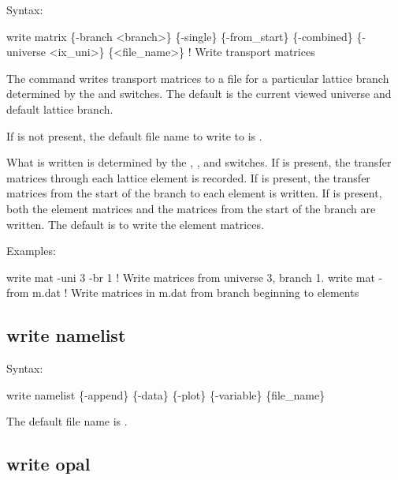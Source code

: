 {{{{{{{{{{{Syntax:
\begin{example}
    write matrix \{-branch <branch>\} \{-single\} \{-from_start\} \{-combined\}
               \{-universe <ix_uni>\} \{<file_name>\}  ! Write transport matrices
\end{example}

The  command writes transport matrices to a file for a particular lattice branch
determined by the  and  switches. The default is the current viewed
universe and default lattice branch.

If  is not present, the default file name to write to is .

What is written is determined by the , , and 
switches. If  is present, the transfer matrices through each lattice element is recorded.
If  is present, the transfer matrices from the start of the branch to each element
is written. If  is present, both the element matrices and the matrices from the start
of the branch are written. The default is to write the element matrices.

Examples:
\begin{example}
  write mat -uni 3 -br 1  ! Write matrices from universe 3, branch 1.
  write mat -from m.dat   ! Write matrices in m.dat from branch beginning to elements
\end{example}


\subsection{write namelist}
\label{s:write.namelist}

Syntax:
\begin{example}
    write namelist \{-append\} \{-data\} \{-plot\} \{-variable\} \{file_name\}
\end{example}

The default file name is .


\subsection{write opal}
\label{s:write.opal}

}}}}}}}}}}}

